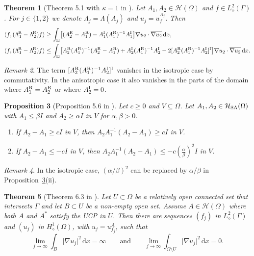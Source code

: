 \documentclass[reqno]{amsart}
\numberwithin{equation}{section}
\numberwithin{figure}{section}
\numberwithin{table}{section}
\theoremstyle{plain}
\newtheorem{theorem}{Theorem}[section]
\newtheorem{proposition}[theorem]{Proposition}
\theoremstyle{definition}
\theoremstyle{remark}
\newtheorem{remark}[theorem]{Remark}
\newcommand{\abs}[1]{\lvert#1\rvert}
\newcommand{\inner}[1]{\langle#1\rangle}
\newcommand{\di}{\mathrm{d}}   %
\newcommand{\upR}{^{\textup{R}}}
\newcommand{\upI}{^{\textup{I}}}
\newcommand{\uptR}{^{\!\textup{R}}}
\newcommand{\LambdaR}{\Lambda\uptR}
\newcommand{\AR}{A\upR}
\newcommand{\AI}{A\upI}
\newcommand{\Hsa}{\mathcal{H}_{\textup{SA}}}
\begin{document}
	\begin{theorem}[Theorem 5.1 with $\kappa = 1$ in \cite{GJZ2025}] \label{thm:generalmono}
		Let $A_1,A_2\in\mathcal{H}(\Omega)$ and $f\in L^2_\diamond(\Gamma)$. For $j\in\{1,2\}$ we denote $\Lambda_j = \Lambda(A_j)$ and $u_j = u_f^{A_j}$. Then
		\begin{align*}
			\inner{f,(\LambdaR_1-\LambdaR_2) f} &\geq \int_\Omega \bigl[(\AR_2-\AR_1) - \AI_1(\AR_1)^{-1}\AI_1 \bigr]\nabla u_2\cdot \overline{\nabla u_2}\,\di x,  \\
			\inner{f,(\LambdaR_1-\LambdaR_2) f} &\leq \int_\Omega \bigl[ \AR_2(\AR_1)^{-1}(\AR_2-\AR_1) + \AI_2(\AR_1)^{-1}\AI_2 - 2[\AR_2(\AR_1)^{-1}\AI_2]\upI \bigr]\nabla u_2\cdot\overline{\nabla u_2}\,\di x.
		\end{align*}
	\end{theorem}
	
	\begin{remark} \label{remark:lastmonoterm}
		The term $[\AR_2(\AR_1)^{-1}\AI_2]\upI$ vanishes in the isotropic case by commutativity. In the anisotropic case it also vanishes in the parts of the domain where $\AR_1 = \AR_2$ or where $\AI_2 = 0$.
	\end{remark}
	
	\begin{proposition}[Proposition 5.6 in \cite{GJZ2025}] \label{prop:bnd}
		Let $c\geq 0$ and $V \subseteq \Omega$. Let $A_1,A_2\in\Hsa(\Omega)$ with $A_1 \leq \beta I$ and $A_2 \geq \alpha I$  in $V$ for $\alpha,\beta>0$. 
		\begin{enumerate}[\rm(i)]
			\item If $A_2-A_1 \geq cI$ in $V$, then $A_2A_1^{-1}(A_2-A_1) \geq cI$ in $V$.
			\item If $A_2-A_1 \leq -cI$ in $V$, then $A_2A_1^{-1}(A_2-A_1) \leq -c(\tfrac{\alpha}{\beta})^2I$ in $V$.
		\end{enumerate}
	\end{proposition}
	
	\begin{remark} \label{remark:isotropicbnd}
		In the isotropic case, $(\alpha/\beta)^2$ can be replaced by $\alpha/\beta$ in Proposition~\ref{prop:bnd}(ii).
	\end{remark}
	
	\begin{theorem}[Theorem 6.3 in \cite{GJZ2025}] \label{thm:locpot}
		Let $U\subset \overline{\Omega}$ be a relatively open connected set that intersects $\Gamma$ and let $B\subset U$ be a non-empty open set. Assume $A\in \mathcal{H}(\Omega)$ where both $A$ and $A^*$ satisfy the UCP in $U$. Then there are sequences $(f_j)$ in $L^2_\diamond(\Gamma)$ and $(u_j)$ in $H^1_\diamond(\Omega)$, with $u_j = u_{f_j}^A$, such that
		\begin{equation*}
			\lim_{j\to\infty} \int_B \abs{\nabla u_j}^2\,\di x = \infty \qquad \text{and} \qquad \lim_{j\to\infty}\int_{\Omega\setminus U} \abs{\nabla u_j}^2\,\di x = 0. 
		\end{equation*}
	\end{theorem}
	
\end{document}
